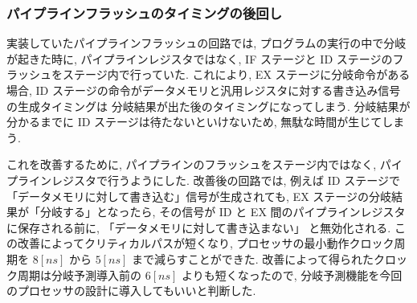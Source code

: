 \documentclass[../improvements.tex]{subfiles}
\begin{document}
  \subsubsection{パイプラインフラッシュのタイミングの後回し} \label{subsubsection:rethink-flush}
  実装していたパイプラインフラッシュの回路では, 
  プログラムの実行の中で分岐が起きた時に, 
  パイプラインレジスタではなく, IF ステージと ID ステージのフラッシュをステージ内で行っていた.
  これにより, EX ステージに分岐命令がある場合, 
  ID ステージの命令がデータメモリと汎用レジスタに対する書き込み信号の生成タイミングは
  分岐結果が出た後のタイミングになってしまう.
  分岐結果が分かるまでに ID ステージは待たないといけないため, 無駄な時間が生じてしまう.

  これを改善するために, パイプラインのフラッシュをステージ内ではなく, パイプラインレジスタで行うようにした.
  改善後の回路では, 例えば ID ステージで「データメモリに対して書き込む」信号が生成されても, 
  EX ステージの分岐結果が「分岐する」となったら, 
  その信号が ID と EX 間のパイプラインレジスタに保存される前に, 「データメモリに対して書き込まない」
  と無効化される.
  この改善によってクリティカルパスが短くなり, 
  プロセッサの最小動作クロック周期を $8[ns]$ から $5[ns]$ まで減らすことができた.
  改善によって得られたクロック周期は分岐予測導入前の $6[ns]$ よりも短くなったので, 
  分岐予測機能を今回のプロセッサの設計に導入してもいいと判断した.
\end{document}
